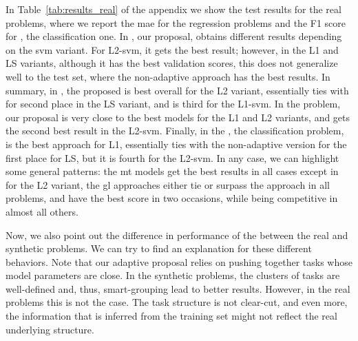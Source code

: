 In Table~\ref{tab:results_real} of the appendix we show the test results for the real problems, where we report the \acrshort{mae} for the regression problems and the F1 score for , the classification one.
%
In , our proposal,  obtains different results depending on the \acrshort{svm} variant. For L2-\acrshort{svm}, it gets the best result; however, in the L1 and LS variants, although it has the best validation scores, this does not generalize well to the test set, where the non-adaptive  approach has the best results.
%
In summary, in , the proposed  is best overall for the L2 variant, essentially ties with  for second place in the LS variant, and is third for the L1-\acrshort{svm}.
%
In the  problem, our proposal is very close to the best models for the L1 and L2 variants, and gets the second best result in the L2-\acrshort{svm}.
%
Finally, in the , the classification problem,  is the best approach for L1, essentially ties with the non-adaptive version for the first place for LS, but it is fourth for the L2-\acrshort{svm}.
%
In any case, we can highlight some general patterns: the \acrshort{mt} models get the best results in all cases except in  for the L2 variant, the \acrshort{gl} approaches either tie or surpass the  approach in all problems, and  have the best score in two occasions, while being competitive in almost all others.

Now, we also point out the difference in performance of the  between the real and synthetic problems.
We can try to find an explanation for these different behaviors. Note that our adaptive proposal relies on pushing together tasks whose model parameters are close. In the synthetic problems, the clusters of tasks are well-defined and, thus, smart-grouping lead to better results. However, in the real problems this is not the case. The task structure is not clear-cut, and even more, the information that is inferred from the training set might not reflect the real underlying structure.
%

